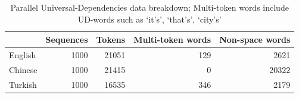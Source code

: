 \begin{table}[ht]
\small
\centering
\begin{tabular}{lrrrr}
\toprule
& \textbf{Sequences} & \textbf{Tokens} & \textbf{Multi-token words} & \textbf{Non-space words}\\
\midrule
English & 1000 & 21051 & 129 & 2621 \\
Chinese & 1000 & 21415 & 0 & 20322 \\
Turkish & 1000 & 16535 & 346 & 2179 \\
\bottomrule
\end{tabular}
\caption[Parallel Universal-Dependencies Breakdown]{Parallel Universal-Dependencies data breakdown; Multi-token words include UD-words such as `it's', `that's', `city's'}
\label{tab:databreakdown}
\end{table}
